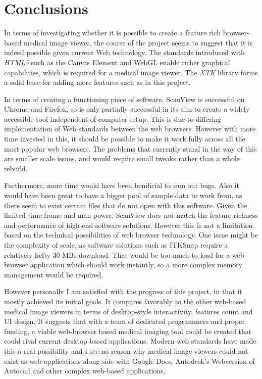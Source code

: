 \documentclass[a4paper,11pt,twoside]{article}
\begin{document}
\section{Conclusions}

In terms of investigating whether it is possible to create a feature rich browser-based medical image viewer, the course of the project seems to suggest that it is indeed possible given current Web technology. The standards introduced with \textit{HTML5} such as the Canvas Element and WebGL enable richer graphical capabilities, which is required for a medical image viewer. The \textit{XTK} library forms a solid base for adding more features such as in this project. 

In terms of creating a functioning piece of software, ScanView is successful on Chrome and Firefox, so is only partially successful in its aim to create a widely accessible tool independent of computer setup. This is due to differing implementation of Web standards between the web browsers. However with more time invested in this, it should be possible to make it work fully across all the most popular web browsers. The problems that currently stand in the way of this are smaller scale issues, and would require small tweaks rather than a whole rebuild.

Furthermore, more time would have been benificial to iron out bugs. Also it would have been great to have a bigger pool of sample data to work from, as there seem to exist certain files that do not open with this software. Given the limited time frame and man power, ScanView does not match the feature richness and performance of high-end software solutions. However this is not a limitation based on the technical possibilities of web browser technology. One issue might be the complexity of scale, as software solutions such as ITKSnap require a relatively hefty 30 MBs download. That would be too much to load for a web browser application which should work instantly, so a more complex memory management would be required.

However personally I am satisfied with the progress of this project, in that it mostly achieved its initial goals. It compares favorably to the other web-based medical image viewers in terms of desktop-style interactivity, features count and UI design. It suggests that with a team of dedicated programmers and proper funding, a viable web-browser based medical imaging tool could be created that could rival current desktop based applications. Modern web standards have made this a real possibility and I see no reason why medical image viewers could not exist as web applications along side with Google Docs, Autodesk's Webversion of Autocad and other complex web-based applications.
\end{document}
